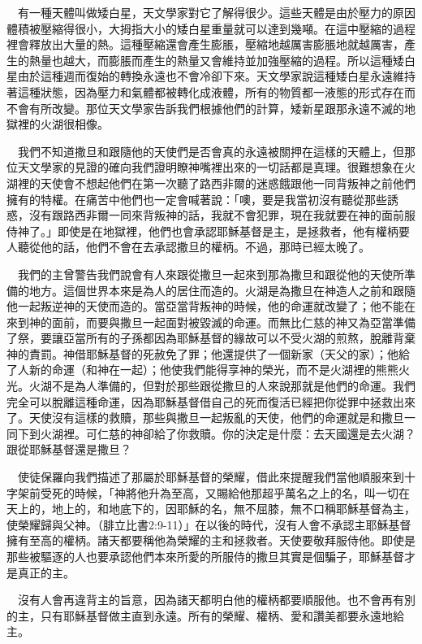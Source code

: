 \documentclass{book}
\begin{document}
　有一種天體叫做矮白星，天文學家對它了解得很少。這些天體是由於壓力的原因體積被壓縮得很小，大拇指大小的矮白星重量就可以達到幾噸。在這中壓縮的過程裡會釋放出大量的熱。這種壓縮還會產生膨脹，壓縮地越厲害膨脹地就越厲害，產生的熱量也越大，而膨脹而產生的熱量又會維持並加強壓縮的過程。所以這種矮白星由於這種週而復始的轉換永遠也不會冷卻下來。天文學家說這種矮白星永遠維持著這種狀態，因為壓力和氣體都被轉化成液體，所有的物質都一液態的形式存在而不會有所改變。那位天文學家告訴我們根據他們的計算，矮新星跟那永遠不滅的地獄裡的火湖很相像。

　我們不知道撒旦和跟隨他的天使們是否會真的永遠被關押在這樣的天體上，但那位天文學家的見證的確向我們證明瞭神嘴裡出來的一切話都是真理。很難想象在火湖裡的天使會不想起他們在第一次聽了路西非爾的迷惑餓跟他一同背叛神之前他們擁有的特權。在痛苦中他們也一定會喊著說：「噢，要是我當初沒有聽從那些誘惑，沒有跟路西非爾一同來背叛神的話，我就不會犯罪，現在我就要在神的面前服侍神了。」即使是在地獄裡，他們也會承認耶穌基督是主，是拯救者，他有權柄要人聽從他的話，他們不會在去承認撒旦的權柄。不過，那時已經太晚了。

　我們的主曾警告我們說會有人來跟從撒旦一起來到那為撒旦和跟從他的天使所準備的地方。這個世界本來是為人的居住而造的。火湖是為撒旦在神造人之前和跟隨他一起叛逆神的天使而造的。當亞當背叛神的時候，他的命運就改變了；他不能在來到神的面前，而要與撒旦一起面對被毀滅的命運。而無比仁慈的神又為亞當準備了祭，要讓亞當所有的子孫都因為耶穌基督的緣故可以不受火湖的煎熬，脫離背棄神的責罰。神借耶穌基督的死赦免了罪；他還提供了一個新家（天父的家）；他給了人新的命運（和神在一起）；他使我們能得享神的榮光，而不是火湖裡的熊熊火光。火湖不是為人準備的，但對於那些跟從撒旦的人來說那就是他們的命運。我們完全可以脫離這種命運，因為耶穌基督借自己的死而復活已經把你從罪中拯救出來了。天使沒有這樣的救贖，那些與撒旦一起叛亂的天使，他們的命運就是和撒旦一同下到火湖裡。可仁慈的神卻給了你救贖。你的決定是什麼：去天國還是去火湖？跟從耶穌基督還是撒旦？

　使徒保羅向我們描述了那屬於耶穌基督的榮耀，借此來提醒我們當他順服來到十字架前受死的時候，「神將他升為至高，又賜給他那超乎萬名之上的名，叫一切在天上的，地上的，和地底下的，因耶穌的名，無不屈膝，無不口稱耶穌基督為主，使榮耀歸與父神。（腓立比書2:9-11）」在以後的時代，沒有人會不承認主耶穌基督擁有至高的權柄。諸天都要稱他為榮耀的主和拯救者。天使要敬拜服侍他。即使是那些被驅逐的人也要承認他們本來所愛的所服侍的撒旦其實是個騙子，耶穌基督才是真正的主。

　沒有人會再違背主的旨意，因為諸天都明白他的權柄都要順服他。也不會再有別的主，只有耶穌基督做主直到永遠。所有的榮耀、權柄、愛和讚美都要永遠地給主。
\end{document}
